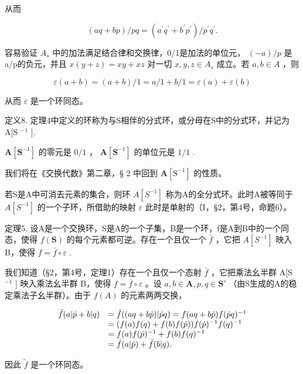 从而

\[
(a q + b p) / p q = (a ^ {\prime} q ^ {\prime} + b ^ {\prime} p ^ {\prime}) / p ^ {\prime} q ^ {\prime}.
\]

容易验证 \(A_{s}\) 中的加法满足结合律和交换律，0/1是加法的单位元， \((-a)/p\) 是a/p的负元，并且 \(x(y + z) = xy + xz\) 对一切 \(x, y, z \in A_{s}\) 成立。若 \(a, b \in A\) ，则

\[
\varepsilon (a + b) = (a + b) / 1 = a / 1 + b / 1 = \varepsilon (a) + \varepsilon (b)
\]

从而 \(\varepsilon\) 是一个环同态。

定义8. 定理4中定义的环称为与S相伴的分式环，或分母在S中的分式环，并记为A{[}S \(^{-1}\) {]}.

\(\mathbf{A}[\mathbf{S}^{-1}]\) 的零元是 \(0 / 1\) ， \(\mathbf{A}[\mathbf{S}^{-1}]\) 的单位元是 \(1 / 1\) .

我们将在《交换代数》第二章，§ 2 中回到 \(\mathbf{A}[\mathrm{S}^{-1}]\) 的性质。

若S是A中可消去元素的集合，则环 \(A[S^{-1}]\) 称为A的全分式环。此时A被等同于 \(A[S^{-1}]\) 的一个子环，所借助的映射 \(\varepsilon\) 此时是单射的（I，§2，第4号，命题6）。

定理5. 设A是一个交换环，S是A的一个子集，B是一个环，f是A到B中的一个同态，使得 \(f(\mathbf{S})\) 的每个元素都可逆。存在一个且仅一个 \(\bar{f}\) ，它把 \(A[S^{-1}]\) 映入 B，使得 \(f = \bar{f} \circ \varepsilon\) .

我们知道（§2，第4号，定理1）存在一个且仅一个态射 \(\bar{f}\) ，它把乘法幺半群 A{[}S \(^{-1}\) {]} 映入乘法幺半群 B，使得 \(f = \bar{f} \circ \varepsilon\) 。设 \(a, b \in \mathbf{A}, p, q \in \mathbf{S}'\) （由S生成的A的稳定乘法子幺半群）。由于 \(f(A)\) 的元素两两交换，

\[
\begin{array}{r l} \bar {f} (a | \dot {p} + b | q) & = \bar {f} ((a q + b \dot {p}) | \dot {p} q) = f (a q + b \dot {p}) f (\dot {p} q) ^ {- 1} \\ & = (f (a) f (q) + f (b) f (\dot {p})) f (\dot {p}) ^ {- 1} f (q) ^ {- 1} \\ & = f (a) f (\dot {p}) ^ {- 1} + f (b) f (q) ^ {- 1} \\ & = \bar {f} (a | \dot {p}) + \bar {f} (b | q). \end{array}
\]

因此 \(\tilde{f}\) 是一个环同态。

